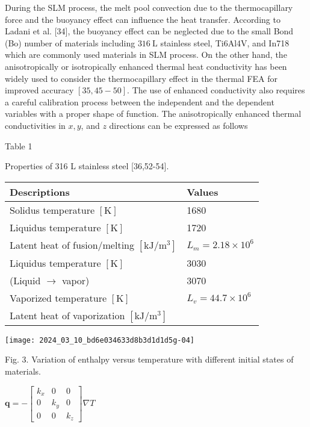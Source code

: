 \documentclass[10pt]{article}
\begin{document}
During the SLM process, the melt pool convection due to the thermocapillary force and the buoyancy effect can influence the heat transfer. According to Ladani et al. [34], the buoyancy effect can be neglected due to the small Bond (Bo) number of materials including $316 \mathrm{~L}$ stainless steel, Ti6Al4V, and In718 which are commonly used materials in SLM process. On the other hand, the anisotropically or isotropically enhanced thermal heat conductivity has been widely used to consider the thermocapillary effect in the thermal FEA for improved accuracy $[35,45-50]$. The use of enhanced conductivity also requires a careful calibration process between the independent and the dependent variables with a proper shape of function. The anisotropically enhanced thermal conductivities in $x, y$, and $z$ directions can be expressed as follows

Table 1

Properties of 316 L stainless steel [36,52-54].

\begin{center}
\begin{tabular}{ll}
\hline
Descriptions & Values \\
\hline
Solidus temperature $[\mathrm{K}]$ & 1680 \\
Liquidus temperature $[\mathrm{K}]$ & 1720 \\
Latent heat of fusion/melting $\left[\mathrm{kJ} / \mathrm{m}^{3}\right]$ & $L_{m}=2.18 \times 10^{6}$ \\
Liquidus temperature $[\mathrm{K}]$ & 3030 \\
(Liquid $\rightarrow$ vapor) & 3070 \\
Vaporized temperature $[\mathrm{K}]$ & $L_{v}=44.7 \times 10^{6}$ \\
Latent heat of vaporization $\left[\mathrm{kJ} / \mathrm{m}^{3}\right]$ &  \\
\end{tabular}
\end{center}

\begin{center}
\texttt{[image: 2024\_03\_10\_bd6e034633d8b3d1d1d5g-04]}
\end{center}

Fig. 3. Variation of enthalpy versus temperature with different initial states of materials.

$\boldsymbol{q}=-\left[\begin{array}{ccc}k_{x} & 0 & 0 \\ 0 & k_{y} & 0 \\ 0 & 0 & k_{z}\end{array}\right] \nabla T$
\end{document}

